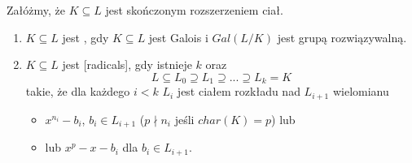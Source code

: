 \begin{bbox}
Załóżmy, że $K\subseteq L$ jest skończonym rozszerzeniem ciał.
\begin{enumerate}[leftmargin=*]
    \item $K\subseteq L$ jest , gdy $K\subseteq L$ jest Galois i $Gal(L/K)$ jest grupą rozwiązywalną.
    \item $K\subseteq L$ jest  [radicals], gdy istnieje $k$ oraz 
    $$L\subseteq L_0\supseteq L_1\supseteq...\supseteq L_k=K$$
    takie, że dla każdego $i<k$ $L_i$ jest ciałem rozkładu nad $L_{i+1}$ wielomianu 
    \begin{itemize}
        \item $x^{n_i}-b_i$, $b_i\in L_{i+1}$ ($p\nmid n_i$ jeśli $char(K)=p$) lub 
        \item lub $x^p-x-b_i$ dla $b_i\in L_{i+1}$.
    \end{itemize}
\end{enumerate}
\end{bbox}

